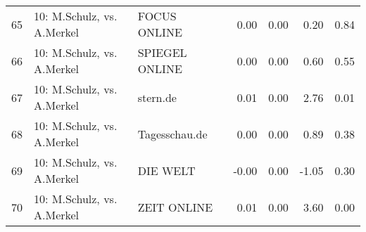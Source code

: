 \begin{table}[ht]
{\begin{tabular}{rllrrrr}
  65 & 10: M.Schulz, vs. A.Merkel & FOCUS ONLINE & 0.00 & 0.00 & 0.20 & 0.84 \\ 
  66 & 10: M.Schulz, vs. A.Merkel & SPIEGEL ONLINE & 0.00 & 0.00 & 0.60 & 0.55 \\ 
  67 & 10: M.Schulz, vs. A.Merkel & stern.de & 0.01 & 0.00 & 2.76 & 0.01 \\ 
  68 & 10: M.Schulz, vs. A.Merkel & Tagesschau.de & 0.00 & 0.00 & 0.89 & 0.38 \\ 
  69 & 10: M.Schulz, vs. A.Merkel & DIE WELT & -0.00 & 0.00 & -1.05 & 0.30 \\ 
  70 & 10: M.Schulz, vs. A.Merkel & ZEIT ONLINE & 0.01 & 0.00 & 3.60 & 0.00 \\ 
   \hline
\end{tabular}
}
\end{table}
